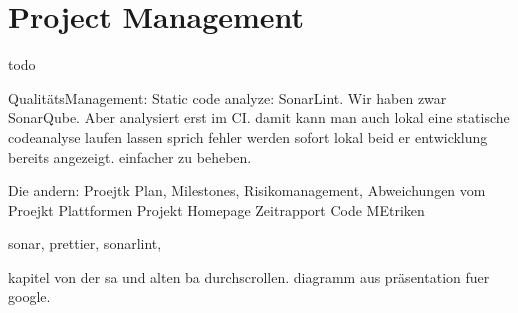 \section{Project Management}
\label{section:project_management}


todo

QualitätsManagement: Static code analyze: SonarLint. \cite{sonar-lint}
Wir haben zwar SonarQube. Aber analysiert erst im CI.
damit kann man auch lokal eine statische codeanalyse laufen lassen sprich fehler werden sofort lokal beid er
entwicklung bereits angezeigt. einfacher zu beheben.


Die andern:
Proejtk Plan, Milestones, Risikomanagement, Abweichungen vom Proejkt Plattformen
Projekt Homepage
Zeitrapport
Code MEtriken



sonar, prettier, sonarlint,

kapitel von der sa und alten ba durchscrollen.
diagramm aus präsentation fuer google.
